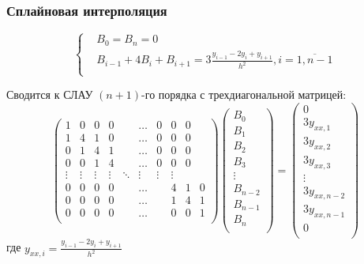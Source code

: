 \documentclass[10pt]{beamer}
\begin{document}
\begin{frame}[fragile]
\frametitle{Сплайновая интерполяция}
$$
\left\lbrace
\begin{aligned}
&B_0 = B_n = 0\\
&B_{i-1} +  4 B_{i} + B_{i+1} = 3 \frac{y_{i-1} - 2 y_{i} + y_{i+1}}{h^2} , i = \overline{1, n-1}\\
\end{aligned}
\right.
$$

Сводится к СЛАУ $(n+1)$-го порядка с трехдиагональной матрицей:
$$
\begin{pmatrix}
   1 & 0 & 0 & 0 & &\hdots& 0 & 0 & 0 \\
   1 & 4 & 1 & 0 & &\hdots& 0 & 0 & 0 \\
   0 & 1 & 4 & 1 & &\hdots& 0 & 0 & 0 \\
   0 & 0 & 1 & 4 & &\hdots& 0 & 0 & 0 \\
  \vdots& \vdots& \vdots& \vdots& \ddots& \vdots& \vdots& \vdots \\
   0 & 0 & 0 & 0 & &\hdots&  & 4 & 1 & 0 \\
   0 & 0 & 0 & 0 & &\hdots&  & 1 & 4 & 1 \\
   0 & 0 & 0 & 0 & &\hdots&  & 0 & 0 & 1 \\
\end{pmatrix}
\begin{pmatrix}
B_0\\
B_1\\
B_2\\
B_3\\
\vdots\\
B_{n-2}\\
B_{n-1}\\
B_n\\
\end{pmatrix}
=
\begin{pmatrix}
0\\
3 {y}_{xx, 1} \\
3 {y}_{xx, 2} \\
3 {y}_{xx, 3} \\
\vdots\\
3 {y}_{xx, n-2} \\
3 {y}_{xx, n-1} \\
0\\
\end{pmatrix}
$$
где 
${y}_{xx, i} = \frac{y_{i-1} - 2 y_{i} + y_{i+1}}{h^2}$

\end{frame}
\end{document}
